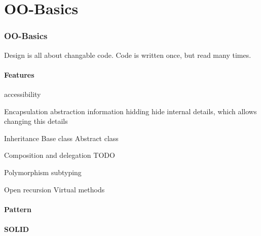 \documentclass{beamer}
\begin{document}
\part{OO-Basics}

\section{OO-Basics}

\begin{frame}
Design is all about changable code.
Code is written once, but read many times.
\end{frame}

\subsection{Features}

\begin{frame}
accessibility
\end{frame}

\begin{frame}{Encapsulation}
abstraction
information hidding
hide internal details, which allows changing this details
\end{frame}

\begin{frame}{Inheritance}
Base class
Abstract class
\end{frame}

\begin{frame}{Composition and delegation}
TODO
\end{frame}

\begin{frame}{Polymorphism}
subtyping
\end{frame}

\begin{frame}{Open recursion}
Virtual methods




\end{frame}


\subsection{Pattern}



\subsection{SOLID}
\end{document}
